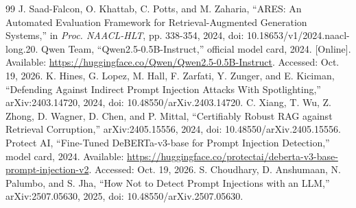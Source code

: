 \documentclass[conference,a4paper]{IEEEtran}
\begin{document}
\begin{thebibliography}{99}
 J. Saad-Falcon, O. Khattab, C. Potts, and M. Zaharia, ``ARES: An Automated Evaluation Framework for Retrieval-Augmented Generation Systems,'' in \emph{Proc. NAACL-HLT}, pp. 338-354, 2024, doi: 10.18653/v1/2024.naacl-long.20.
 Qwen Team, ``Qwen2.5-0.5B-Instruct,'' official model card, 2024. [Online]. Available: \url{https://huggingface.co/Qwen/Qwen2.5-0.5B-Instruct}. Accessed: Oct. 19, 2026.
 K. Hines, G. Lopez, M. Hall, F. Zarfati, Y. Zunger, and E. Kiciman, ``Defending Against Indirect Prompt Injection Attacks With Spotlighting,'' arXiv:2403.14720, 2024, doi: 10.48550/arXiv.2403.14720.
 C. Xiang, T. Wu, Z. Zhong, D. Wagner, D. Chen, and P. Mittal, ``Certifiably Robust RAG against Retrieval Corruption,'' arXiv:2405.15556, 2024, doi: 10.48550/arXiv.2405.15556.
 Protect AI, ``Fine-Tuned DeBERTa-v3-base for Prompt Injection Detection,'' model card, 2024. Available: \url{https://huggingface.co/protectai/deberta-v3-base-prompt-injection-v2}. Accessed: Oct. 19, 2026.
 S. Choudhary, D. Anshumaan, N. Palumbo, and S. Jha, ``How Not to Detect Prompt Injections with an LLM,'' arXiv:2507.05630, 2025, doi: 10.48550/arXiv.2507.05630.
\end{thebibliography}
\end{document}
